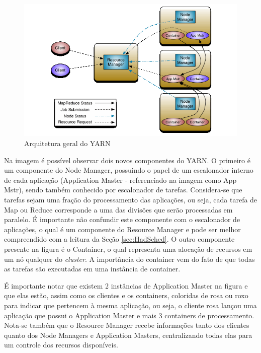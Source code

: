 \begin{figure}[!hbtn]
   \centering
   \includegraphics[width=12cm]{figuras/Figura06-YarnArch.png}
   \caption{Arquitetura geral do YARN \cite{YARN}}
   \label{fig:ArqYARN}
\end{figure}

Na imagem é possível observar dois novos componentes do YARN. O primeiro é um componente do Node Manager, possuindo o papel de um escalonador interno de cada aplicação (Application Master - referenciado na imagem como App Mstr), sendo também conhecido por escalonador de tarefas. Considera-se que tarefas sejam uma fração do processamento das aplicações, ou seja, cada tarefa de Map ou Reduce corresponde a uma das divisões que serão processadas em paralelo. É importante não confundir este componente com o escalonador de aplicações, o qual é um componente do Resource Manager e pode ser melhor compreendido com a leitura da Seção \ref{sec:HadSched}. O outro componente presente na figura é o Container, o qual representa uma alocação de recursos em um nó qualquer do \textit{cluster}. A importância do container vem do fato de que todas as tarefas são executadas em uma instância de container.

É importante notar que existem 2 instâncias de Application Master na figura e que elas estão, assim como os clientes e os containers, coloridas de rosa ou roxo para indicar que pertencem à mesma aplicação, ou seja, o cliente rosa lançou uma aplicação que possui o Application Master e mais 3 containers de processamento. Nota-se também que o Resource Manager recebe informações tanto dos clientes quanto dos Node Managers e Application Masters, centralizando todas elas para um controle dos recursos disponíveis.

